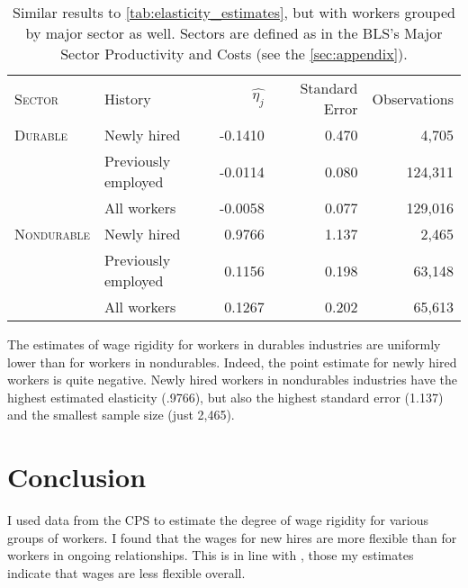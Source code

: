 \documentclass[11pt]{article}
\begin{document}
\begin{table}
    \centering
    \begin{tabular}{llrrr} \toprule
       \textsc{Sector}     & History              & $\hat{\eta_j}$ & Standard Error   & Observations\\
       \textsc{Durable}    & Newly hired          & -0.1410         & 0.470            & 4,705       \\
                  & Previously employed  & -0.0114         & 0.080            & 124,311     \\
                  & All workers          & -0.0058         & 0.077            & 129,016     \\
       \textsc{Nondurable} & Newly hired          & 0.9766          & 1.137            & 2,465       \\
                  & Previously employed  & 0.1156          & 0.198            & 63,148      \\
                  & All workers          & 0.1267          & 0.202            & 65,613      \\ \bottomrule
    \end{tabular}
    \caption{
                Similar results to \autoref{tab:elasticity_estimates}, but with workers grouped by major sector as well. Sectors are defined as in the BLS's Major Sector Productivity and Costs (see the \autoref{sec:appendix}).
            }
    \label{tab:elasticity_estimates_sector}
\end{table}

The estimates of wage rigidity for workers in durables industries are uniformly lower than for workers in nondurables.
Indeed, the point estimate for newly hired workers is quite negative.
Newly hired workers in nondurables industries have the highest estimated elasticity (.9766), but also the highest standard error (1.137) and the smallest sample size (just 2,465).


\section{Conclusion}

I used data from the CPS to estimate the degree of wage rigidity for various groups of workers.
I found that the wages for new hires are more flexible than for workers in ongoing relationships.
This is in line with \cite{haefke_sonntag_vanRens_2013}, those my estimates indicate that wages are less flexible overall.
\end{document}
